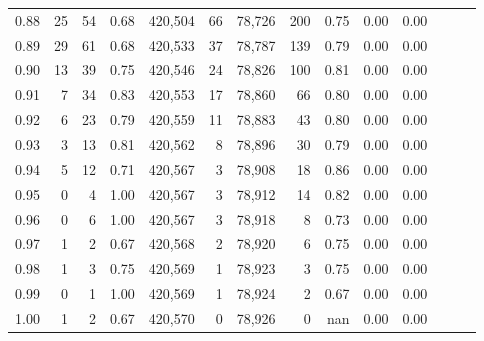\begin{tabular}{rrrrrrrrrrrrrr}
0.88 &      25 &     54 &  0.68 &  420,504 &       66 &  78,726 &     200 &  0.75 &  0.00 &      0.00 \\
0.89 &      29 &     61 &  0.68 &  420,533 &       37 &  78,787 &     139 &  0.79 &  0.00 &      0.00 \\
0.90 &      13 &     39 &  0.75 &  420,546 &       24 &  78,826 &     100 &  0.81 &  0.00 &      0.00 \\
0.91 &       7 &     34 &  0.83 &  420,553 &       17 &  78,860 &      66 &  0.80 &  0.00 &      0.00 \\
0.92 &       6 &     23 &  0.79 &  420,559 &       11 &  78,883 &      43 &  0.80 &  0.00 &      0.00 \\
0.93 &       3 &     13 &  0.81 &  420,562 &        8 &  78,896 &      30 &  0.79 &  0.00 &      0.00 \\
0.94 &       5 &     12 &  0.71 &  420,567 &        3 &  78,908 &      18 &  0.86 &  0.00 &      0.00 \\
0.95 &       0 &      4 &  1.00 &  420,567 &        3 &  78,912 &      14 &  0.82 &  0.00 &      0.00 \\
0.96 &       0 &      6 &  1.00 &  420,567 &        3 &  78,918 &       8 &  0.73 &  0.00 &      0.00 \\
0.97 &       1 &      2 &  0.67 &  420,568 &        2 &  78,920 &       6 &  0.75 &  0.00 &      0.00 \\
0.98 &       1 &      3 &  0.75 &  420,569 &        1 &  78,923 &       3 &  0.75 &  0.00 &      0.00 \\
0.99 &       0 &      1 &  1.00 &  420,569 &        1 &  78,924 &       2 &  0.67 &  0.00 &      0.00 \\
1.00 &       1 &      2 &  0.67 &  420,570 &        0 &  78,926 &       0 &   nan &  0.00 &      0.00 \\
\bottomrule
\end{tabular}

